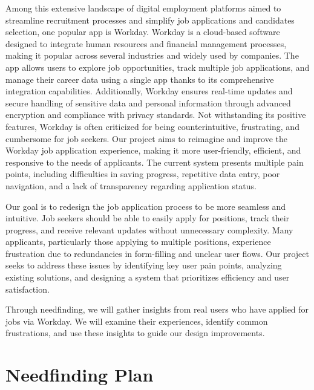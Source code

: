 \documentclass[
	letterpaper, %
]{jdf}
\begin{document}
\begin{sloppypar}
Among this extensive landscape of digital employment platforms aimed to streamline recruitment processes and simplify job applications and candidates selection, one popular app is Workday. Workday is a cloud-based software designed to integrate human resources and financial management processes, making it popular across several industries and widely used by companies. The app allows users to explore job opportunities, track multiple job applications, and manage their career data using a single app thanks to its comprehensive integration capabilities. Additionally, Workday ensures real-time updates and secure handling of sensitive data and personal information through advanced encryption and compliance with privacy standards. Not withstanding its positive features, Workday is often criticized for being counterintuitive, frustrating, and cumbersome for job seekers. Our project aims to reimagine and improve the Workday job application experience, making it more user-friendly, efficient, and responsive to the needs of applicants. The current system presents multiple pain points, including difficulties in saving progress, repetitive data entry, poor navigation, and a lack of transparency regarding application status.

Our goal is to redesign the job application process to be more seamless and intuitive. Job seekers should be able to easily apply for positions, track their progress, and receive relevant updates without unnecessary complexity. Many applicants, particularly those applying to multiple positions, experience frustration due to redundancies in form-filling and unclear user flows. Our project seeks to address these issues by identifying key user pain points, analyzing existing solutions, and designing a system that prioritizes efficiency and user satisfaction.

Through needfinding, we will gather insights from real users who have applied for jobs via Workday. We will examine their experiences, identify common frustrations, and use these insights to guide our design improvements. 

\newpage

\section{Needfinding Plan}

\end{sloppypar}
\end{document}
